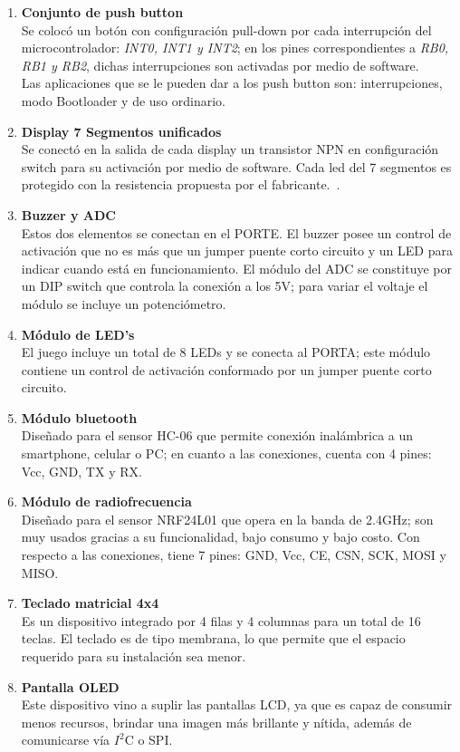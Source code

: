 \documentclass[times, 10pt,twocolumn]{article}
\begin{document}
\begin{enumerate}[label=\emph{\Alph*.}]
  \item \textbf{Conjunto de push button}\\ Se colocó un botón con configuración pull-down por cada interrupción del microcontrolador: \textit{INT0, INT1 y INT2}; en los pines correspondientes a \textit{RB0, RB1 y RB2}, dichas interrupciones son activadas por medio de software. \\    
Las aplicaciones que se le pueden dar a los push button son: interrupciones, modo Bootloader y de uso ordinario.
  \item \textbf{Display 7 Segmentos unificados}\\ Se conectó en la salida de cada display un transistor NPN en configuración switch para su activación por medio de software. Cada led del 7 segmentos es protegido con la resistencia propuesta por el fabricante.~\cite{ex2}.
  \item \textbf{Buzzer y ADC}\\ Estos dos elementos se conectan en el PORTE. El buzzer posee un control de activación que no es más que un jumper puente corto circuito y un LED para indicar cuando está en funcionamiento. El módulo del ADC se constituye por un DIP switch que controla la conexión a los 5V; para variar el voltaje el módulo se incluye un potenciómetro.
  \item \textbf{Módulo de LED's}\\ El juego incluye un total de 8 LEDs y se conecta al   PORTA; este módulo contiene un control de activación conformado por un jumper puente corto circuito.
  \item \textbf{Módulo bluetooth}\\ Diseñado para el sensor HC-06 que permite conexión inalámbrica a un smartphone, celular o PC; en cuanto a las conexiones, cuenta con 4 pines: Vcc, GND, TX y RX.
  \item \textbf{Módulo de radiofrecuencia}\\ Diseñado para el sensor NRF24L01 que opera en la banda de 2.4GHz; son muy usados gracias a su funcionalidad, bajo consumo y bajo costo. Con respecto a las conexiones, tiene 7 pines: GND, Vcc, CE, CSN, SCK, MOSI y MISO.
  \item \textbf{Teclado matricial 4x4}\\ Es un dispositivo integrado por 4 filas y 4 columnas para un total de 16 teclas. El teclado es de tipo membrana, lo que permite que el espacio requerido para su instalación sea menor.
  \item \textbf{Pantalla OLED}\\ Este dispositivo vino a suplir las pantallas LCD, ya
que es capaz de consumir menos recursos, brindar una imagen más brillante y nítida, además de comunicarse vía $I^{2}$C o SPI.
\end{enumerate}
\end{document}
